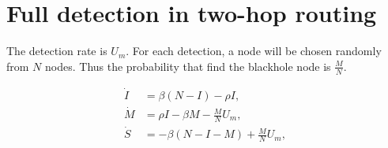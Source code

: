 \section{Full detection in two-hop routing}
\label{sec:full_detect}
%
The detection rate is $U_{m}$.
For each detection, a node will be chosen randomly from $N$ nodes.
Thus the probability that find the blackhole node is $\frac{M}{N}$.
\begin{small}
\begin{equation}
\nonumber
\begin{aligned}
\dot{I} &= \beta (N-I) - \rho I,\\
\dot{M} &= \rho I - \beta M - \frac{M}{N} U_{m},\\
\dot{S} &= - \beta (N-I-M) + \frac{M}{N} U_{m},
\end{aligned}
\end{equation}
\end{small}
